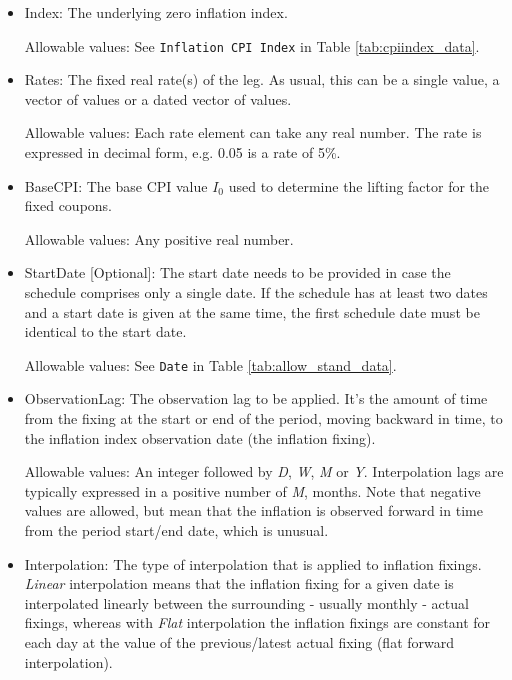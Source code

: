 \begin{itemize}
\item Index: The underlying zero inflation index.

Allowable values:  See \lstinline!Inflation CPI Index! in Table \ref{tab:cpiindex_data}.
\item Rates: The fixed real rate(s) of the leg. As usual, this can be a single value, a vector of values or a dated vector of
  values.
 
 Allowable values: Each rate element can take any  real number. The rate is
  expressed in decimal form, e.g. 0.05 is a rate of 5\%.
\item BaseCPI: The base CPI value $I_0$ used to determine the lifting factor for the fixed coupons.

Allowable values:  Any positive real number.

\item StartDate [Optional]: The start date needs to be provided in case the schedule comprises only a single date. If
  the schedule has at least two dates and a start date is given at the same time, the first schedule date must be
  identical to the start date.
  
Allowable values:  See \lstinline!Date! in Table \ref{tab:allow_stand_data}. 

\item ObservationLag: The observation lag to be applied. It's the amount of time from the fixing at the start or end of the period, moving backward in time, to the inflation index observation date (the inflation fixing). 

Allowable values: An integer followed by \emph{D}, \emph{W}, \emph{M} or \emph{Y}. Interpolation lags are typically expressed in a positive number of  \emph{M}, months. Note that negative values are allowed, but mean that the inflation is observed forward in time from the period start/end date, which is unusual.  

\item Interpolation: The type of interpolation that is applied to inflation fixings. \emph{Linear} interpolation means that the inflation fixing for a given date is interpolated linearly between the surrounding - usually monthly - actual fixings, whereas with  \emph{Flat} interpolation the inflation fixings are constant for each day at the value of the previous/latest actual fixing (flat forward interpolation).  


\end{itemize}
